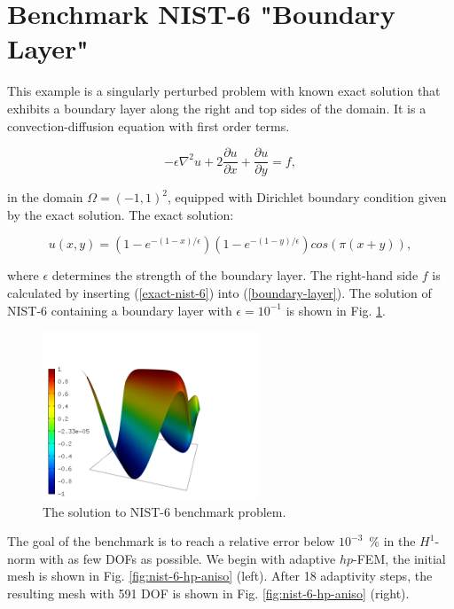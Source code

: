 \section{Benchmark NIST-6 "Boundary Layer"}
\label{sec:bench-6}

This example is a singularly perturbed problem with known exact solution that exhibits
a boundary layer along the right and top sides of the domain.
It is a convection-diffusion equation with first order terms.

\begin{equation} \label{boundary-layer}
-\epsilon \nabla^{2} u + 2\frac{\partial u}{\partial x} + \frac{\partial u}{\partial y} = f,
\end{equation}

in the domain $\Omega = (-1, 1)^2$, equipped with Dirichlet boundary condition
given by the exact solution. The exact solution:

\begin{equation}\label{exact-nist-6}
u(x,y) = (1 - e^{-(1 - x) / \epsilon})(1 - e^{-(1 - y) / \epsilon})cos(\pi (x + y)),
\end{equation}

where $\epsilon$ determines the strength of the boundary layer.
The right-hand side $f$ is calculated by inserting (\ref{exact-nist-6}) into (\ref{boundary-layer}).
The solution of NIST-6 containing a boundary layer
with $\epsilon = 10^{-1}$ is shown in Fig. \ref{fig:sln-nist06}.

\begin{figure}[!ht]
\centering
\includegraphics[height=5cm]{nist/nist-6/solution.png}
\caption{The solution to NIST-6 benchmark problem.}
\label{fig:sln-nist06}
\end{figure}

The goal of the benchmark is to reach a relative error below
$10^{-3}$~\% in the $H^1$-norm with as few DOFs as possible.
We begin with adaptive $hp$-FEM,
the initial mesh is shown in Fig. \ref{fig:nist-6-hp-aniso} (left).
After 18 adaptivity steps, the resulting mesh with 591 DOF is shown
in Fig. \ref{fig:nist-6-hp-aniso} (right).

